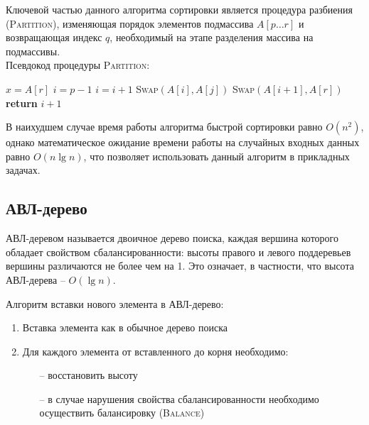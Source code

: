 \newpage

Ключевой частью данного алгоритма сортировки является процедура разбиения (\textsc{Partition}), изменяющая порядок элементов подмассива $A[p \dots r]$ и возвращающая индекс $q$, необходимый на этапе разделения массива на подмассивы.\\

\noindent Псевдокод процедуры \textsc{Partition}:
\begin{algorithmic}[1]
		\State $x=A[r]$
		\State $i=p-1$
				\State $i = i + 1$
				\State \textsc{Swap}$(A[i], A[j])$
			\EndIf
		\EndFor
		\State \textsc{Swap}$(A[i + 1], A[r])$
		\State \textbf{return} $i + 1$
	\EndProcedure
\end{algorithmic}

В наихудшем случае время работы алгоритма быстрой сортировки равно $O(n^2)$, однако математическое ожидание времени работы на случайных входных данных равно $O(n\lg n)$, что позволяет использовать данный алгоритм в прикладных задачах.

\newpage

\subsection{АВЛ-дерево}
АВЛ-деревом называется двоичное дерево поиска, каждая вершина которого обладает свойством сбалансированности: высоты правого и левого поддеревьев вершины различаются не более чем на 1. Это означает, в частности, что высота АВЛ-дерева -- $O(\lg n)$\footnotemark.\\


\noindent Алгоритм вставки нового элемента в АВЛ-дерево:
\begin{enumerate}
\item{Вставка элемента как в обычное дерево поиска}
\item{Для каждого элемента от вставленного до корня необходимо:
	\begin{itemize}
		\item[--]{восстановить высоту}
		\item[--]{в случае нарушения свойства сбалансированности необходимо осуществить балансировку (\textsc{Balance})}
	\end{itemize}}
\end{enumerate}
	
